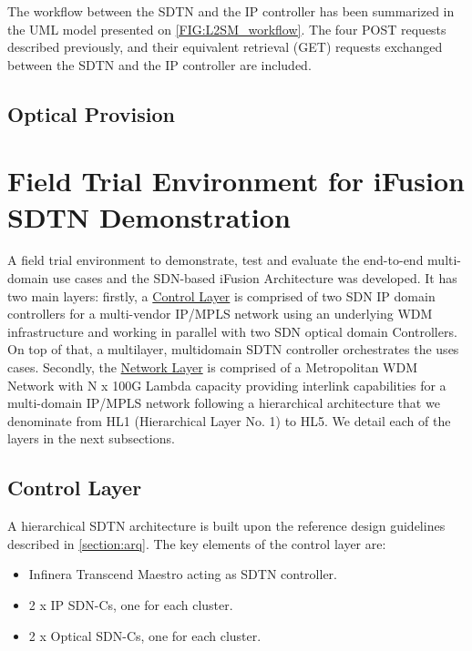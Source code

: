 \documentclass[a4paper,fleqn]{cas-dc}
\begin{document}
The workflow between the SDTN and the IP controller has been summarized in the UML model presented on \cref{FIG:L2SM_workflow}. The four POST requests described previously, and their equivalent retrieval (GET) requests exchanged between the SDTN and the IP controller are included.

\subsection{Optical Provision}
\label{section:optical_provision}

\section{Field Trial Environment for iFusion SDTN Demonstration}
\label{section:trial}

A field trial environment to demonstrate, test and evaluate the end-to-end multi-domain use cases and the SDN-based iFusion Architecture was developed. It has two main layers: firstly, a \hyperref[sec:contollay]{Control Layer} is comprised of two SDN IP domain controllers for a multi-vendor IP/MPLS network using an underlying WDM infrastructure and working in parallel with two SDN optical domain Controllers. On top of that, a multi\-layer, multi\-domain SDTN controller orchestrates the uses cases. Secondly, the \hyperref[sec:netlay]{Network Layer} is comprised of a Metropolitan WDM Network with N x 100G Lambda capacity providing interlink capabilities for a multi-domain IP/MPLS network following a hierarchical architecture that we denominate from HL1 (Hierarchical Layer No. 1) to HL5. We detail each of the layers in the next subsections. 

\subsection{Control Layer}
\label{sec:contollay}
A hierarchical SDTN architecture is built upon the reference design guidelines described in \cref{section:arq}. The key elements of the control layer are:
\begin{itemize}
    \item Infinera Transcend Maestro acting as SDTN controller.
    \item 2 x IP SDN-Cs, one for each cluster.
    \item 2 x Optical SDN-Cs, one for each cluster.
\end{itemize}
\end{document}
